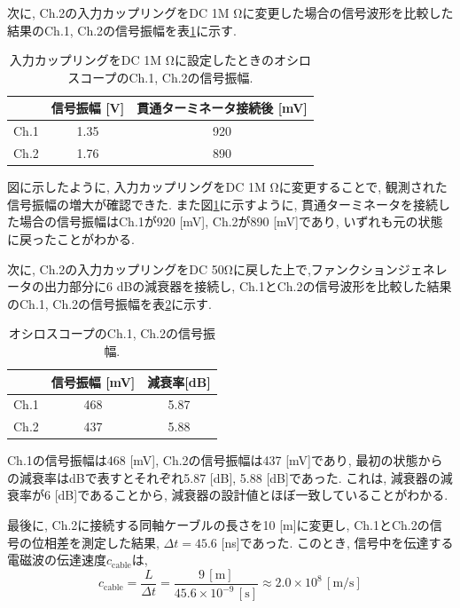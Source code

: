 \documentclass[uplatex,dvipdfmx,a4j,12pt]{jsarticle}
\begin{document}
次に, Ch.2の入力カップリングをDC 1M \si{\ohm}に変更した場合の信号波形を比較した結果のCh.1, Ch.2の信号振幅を表\ref{table:-1-1-2}に示す.
\begin{table}[h]
    \centering
    \caption{入力カップリングをDC 1M \si{\ohm}に設定したときのオシロスコープのCh.1, Ch.2の信号振幅.}
    \label{table:-1-1-2}
    \begin{tabular}{ccc}
        \hline
        & 信号振幅 [V] & 貫通ターミネータ接続後 [mV]\\ %
        \hline\hline
        Ch.1 & 1.35 & 920 \\
        Ch.2 & 1.76 & 890\\
        \hline
    \end{tabular}
\end{table}
図に示したように, 入力カップリングをDC 1M \si{\ohm}に変更することで, 観測された信号振幅の増大が確認できた.
また図\ref{table:-1-1-2}に示すように, 貫通ターミネータを接続した場合の信号振幅はCh.1が920 [mV], Ch.2が890 [mV]であり, いずれも元の状態に戻ったことがわかる.

次に, Ch.2の入力カップリングをDC 50\si{\ohm}に戻した上で,ファンクションジェネレータの出力部分に6 dBの減衰器を接続し, Ch.1とCh.2の信号波形を比較した結果のCh.1, Ch.2の信号振幅を表\ref{table:1-1-3}に示す.
\begin{table}[h]
    \centering
    \caption{オシロスコープのCh.1, Ch.2の信号振幅.}
    \label{table:1-1-3}
    \begin{tabular}{ccc}
        \hline
        & 信号振幅 [mV]& 減衰率[dB]\\
        \hline\hline
        Ch.1 & 468 & 5.87\\
        Ch.2 & 437 & 5.88\\
        \hline
    \end{tabular}
\end{table}
Ch.1の信号振幅は468 [mV], Ch.2の信号振幅は437 [mV]であり, 最初の状態からの減衰率はdBで表すとそれぞれ5.87 [dB], 5.88 [dB]であった.
これは, 減衰器の減衰率が6 [dB]であることから, 減衰器の設計値とほぼ一致していることがわかる.

最後に, Ch.2に接続する同軸ケーブルの長さを10 [m]に変更し, Ch.1とCh.2の信号の位相差を測定した結果, $\Delta t = 45.6$ [ns]であった.
このとき, 信号中を伝達する電磁波の伝達速度$c_\mathrm{cable}$は,
\begin{equation}
  c_\mathrm{cable} = \frac{L}{\Delta t} = \frac{9\,\mathrm{[m]}}{45.6 \times 10^{-9}\,\mathrm{[s]}} \approx 2.0 \times 10^8 \mathrm{\,[m/s]}
\end{equation}
\end{document}
